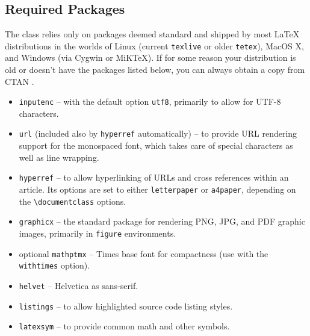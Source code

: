 \documentclass{easychair}
\newcommand{\easychair}{\sf{easychair}}
\newcommand{\miktex}{MiK{\TeX}}
\begin{document}
\subsection{Required Packages}

The {\easychair} class relies only on packages deemed standard and shipped by
most {\LaTeX} distributions in the worlds of Linux (current \texttt{texlive} \cite{texlive}
or older \texttt{tetex}), MacOS X,
and Windows (via Cygwin or {\miktex}).
If for some reason your distribution is old or doesn't have the packages
listed below, you can always obtain a copy from CTAN \cite{ctan}.

\begin{itemize}
\item
\texttt{inputenc} \cite{inputenc-package} -- with the default option
\texttt{utf8}, primarily to allow for UTF-8 characters.

\item
\texttt{url} \cite{url-package} (included also by \texttt{hyperref} automatically) -- to provide URL rendering support for the
monospaced font, which takes care of special characters as well as line 
wrapping.

\item
\texttt{hyperref} \cite{hyperref-package} -- to allow hyperlinking of URLs and
cross references within an article.
Its options are set to either \verb+letterpaper+ or \verb+a4paper+, depending
on the \verb+\documentclass+ options.

\item
\texttt{graphicx} \cite{graphicx-package} -- the standard package for rendering
PNG, JPG, and PDF graphic images, primarily in \texttt{figure} environments.

\item
optional \texttt{mathptmx} \cite{mathptmx-package} -- Times base font for compactness
(use with the \texttt{withtimes} {\easychair} option).

\item
\texttt{helvet} \cite{helvet-package} -- Helvetica as {\sf sans-serif}.

\item
\texttt{listings} \cite{listings-package} -- to allow highlighted source code 
listing styles.

\item
\texttt{latexsym} \cite{latexsym-package} -- to provide common math and other 
symbols.


\end{itemize}
\end{document}

